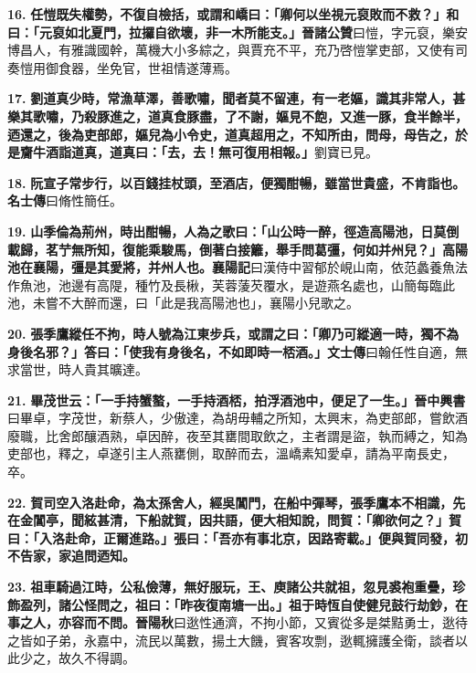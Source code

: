 \textbf{16.} \textbf{任愷既失權勢，不復自檢括，或謂和嶠曰：「卿何以坐視元裒敗而不救？」和曰：「元裒如北夏門，拉攞自欲壞，非一木所能支。」}{\footnotesize \textbf{晉諸公贊}曰愷，字元裒，樂安博昌人，有雅識國幹，萬機大小多綜之，與賈充不平，充乃啓愷掌吏部，又使有司奏愷用御食器，坐免官，世祖情遂薄焉。}

\textbf{17.} \textbf{劉道真少時，常漁草澤，善歌嘯，聞者莫不留連，有一老嫗，識其非常人，甚樂其歌嘯，乃殺豚進之，道真食豚盡，了不謝，嫗見不飽，又進一豚，食半餘半，迺還之，後為吏部郎，嫗兒為小令史，道真超用之，不知所由，問母，母告之，於是齎牛酒詣道真，道真曰：「去，去！無可復用相報。」}{\footnotesize 劉寶已見。}

\textbf{18.} \textbf{阮宣子常步行，以百錢挂杖頭，至酒店，便獨酣暢，雖當世貴盛，不肯詣也。}{\footnotesize \textbf{名士傳}曰脩性簡任。}

\textbf{19.} \textbf{山季倫為荊州，時出酣暢，人為之歌曰：「山公時一醉，徑造高陽池，日莫倒載歸，茗艼無所知，復能乘駿馬，倒著白接籬，舉手問葛彊，何如并州兒？」高陽池在襄陽，彊是其愛將，并州人也。}{\footnotesize \textbf{襄陽記}曰漢侍中習郁於峴山南，依范蠡養魚法作魚池，池邊有高隄，種竹及長楸，芙蓉蔆芡覆水，是遊燕名處也，山簡每臨此池，未嘗不大醉而還，曰「此是我高陽池也」，襄陽小兒歌之。}

\textbf{20.} \textbf{張季鷹縱任不拘，時人號為江東步兵，或謂之曰：「卿乃可縱適一時，獨不為身後名邪？」答曰：「使我有身後名，不如即時一桮酒。」}{\footnotesize \textbf{文士傳}曰翰任性自適，無求當世，時人貴其曠達。}

\textbf{21.} \textbf{畢茂世云：「一手持蟹螯，一手持酒桮，拍浮酒池中，便足了一生。」}{\footnotesize \textbf{晉中興書}曰畢卓，字茂世，新蔡人，少傲達，為胡毋輔之所知，太興末，為吏部郎，嘗飲酒廢職，比舍郎釀酒熟，卓因醉，夜至其罋間取飲之，主者謂是盜，執而縛之，知為吏部也，釋之，卓遂引主人燕罋側，取醉而去，溫嶠素知愛卓，請為平南長史，卒。}

\textbf{22.} \textbf{賀司空入洛赴命，為太孫舍人，經吳閶門，在船中彈琴，張季鷹本不相識，先在金閶亭，聞絃甚清，下船就賀，因共語，便大相知說，問賀：「卿欲何之？」賀曰：「入洛赴命，正爾進路。」張曰：「吾亦有事北京，因路寄載。」便與賀同發，初不告家，家追問迺知。}

\textbf{23.} \textbf{祖車騎過江時，公私儉薄，無好服玩，王、庾諸公共就祖，忽見裘袍重疊，珍飾盈列，諸公怪問之，祖曰：「昨夜復南塘一出。」祖于時恆自使健兒鼓行劫鈔，在事之人，亦容而不問。}{\footnotesize \textbf{晉陽秋}曰逖性通濟，不拘小節，又賓從多是桀黠勇士，逖待之皆如子弟，永嘉中，流民以萬數，揚土大饑，賓客攻剽，逖輒擁護全衛，談者以此少之，故久不得調。}

